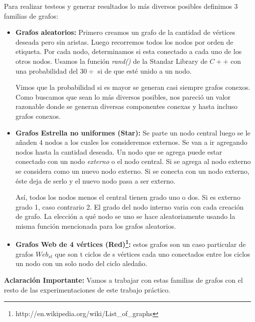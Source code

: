 \quad Para realizar testeos y generar resultados lo más diversos posibles definimos 3 familias de grafos:

\begin{itemize}
\item \textbf{Grafos aleatorios:} \quad Primero creamos un grafo de la cantidad de vértices deseada pero sin aristas. Luego recorremos todos los nodos por orden de etiqueta. Por cada nodo, determinamos si esta conectado a cada uno de los otros nodos. Usamos la función \textit{rand()} de la Standar Library de $C++$ con una probabilidad del $ 30\div $ si de que esté unido a un nodo. 

 \quad Vimos que la probabilidad si es mayor se generan casi siempre grafos conexos. Como buscamos que sean lo más diversos posibles, nos pareció un valor razonable donde se generan diversas componentes conexas y hasta incluso grafos conexos.

\quad

\item \textbf{Grafos Estrella no uniformes (Star):} \quad Se parte un nodo central luego se le añaden 4 nodos a los cuales los consideremos externos. Se van a ir agregando nodos hasta la cantidad deseada. Un nodo que se agrega puede estar conectado con un nodo \textit{externo} o el nodo central. Si se agrega al nodo externo se considera como un nuevo nodo externo. Si se conecta con un nodo externo, éste deja de serlo y el nuevo nodo pasa a ser externo. 

\quad Así, todos los nodos menos el central tienen grado uno o dos. Si es externo grado 1, caso contrario 2. El grado del nodo interno varia con cada creación de grafo. La elección a qué nodo se uno se hace aleatoriamente usando la misma función mencionada para los grafos aleatorios.

\quad

\item \textbf{Grafos Web de 4 vértices (Red)\footnote{http://en.wikipedia.org/wiki/List\_of\_graphs}:} \quad estos grafos son un caso particular de grafos $ Web_{s t} $ que son t ciclos de s vértices cada uno conectados entre los ciclos un nodo con un solo nodo del ciclo aledaño. 
\end{itemize}

\quad

\quad \textbf{Aclaración Importante:} Vamos a trabajar con estas familias de grafos con el resto de las experimentaciones de este trabajo práctico. 

\quad 

